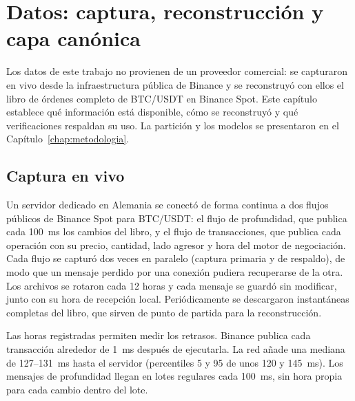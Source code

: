\chapter{Datos: captura, reconstrucción y capa canónica}
\label{chap:datos}

Los datos de este trabajo no provienen de un proveedor comercial: se capturaron en vivo desde la infraestructura pública de Binance y se reconstruyó con ellos el libro de órdenes completo de BTC/USDT en Binance Spot. Este capítulo establece qué información está disponible, cómo se reconstruyó y qué verificaciones respaldan su uso. La partición y los modelos se presentaron en el Capítulo~\ref{chap:metodologia}.

\section{Captura en vivo}
Un servidor dedicado en Alemania se conectó de forma continua a dos flujos públicos de Binance Spot para BTC/USDT: el flujo de profundidad, que publica cada 100~ms los cambios del libro, y el flujo de transacciones, que publica cada operación con su precio, cantidad, lado agresor y hora del motor de negociación. Cada flujo se capturó dos veces en paralelo (captura primaria y de respaldo), de modo que un mensaje perdido por una conexión pudiera recuperarse de la otra. Los archivos se rotaron cada 12 horas y cada mensaje se guardó sin modificar, junto con su hora de recepción local. Periódicamente se descargaron instantáneas completas del libro, que sirven de punto de partida para la reconstrucción.

Las horas registradas permiten medir los retrasos. Binance publica cada transacción alrededor de 1~ms después de ejecutarla. La red añade una mediana de 127--131~ms hasta el servidor (percentiles 5 y 95 de unos 120 y 145~ms). Los mensajes de profundidad llegan en lotes regulares cada 100~ms, sin hora propia para cada cambio dentro del lote.

